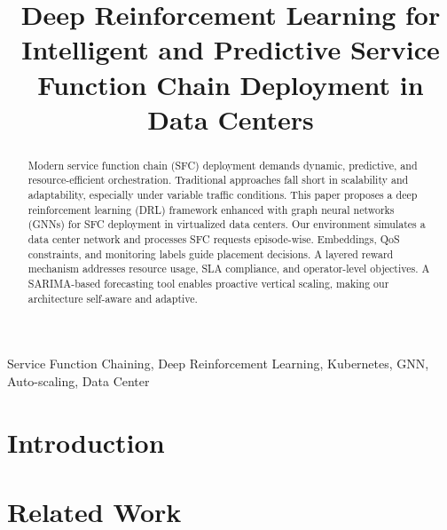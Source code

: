\documentclass[conference]{IEEEtran}
\begin{document}
	
	\title{Deep Reinforcement Learning for Intelligent and Predictive Service Function Chain Deployment in Data Centers}
	
	\author{
	}
	
	\maketitle
	
	\begin{abstract}
		Modern service function chain (SFC) deployment demands dynamic, predictive, and resource-efficient orchestration. Traditional approaches fall short in scalability and adaptability, especially under variable traffic conditions. This paper proposes a deep reinforcement learning (DRL) framework enhanced with graph neural networks (GNNs) for SFC deployment in virtualized data centers. Our environment simulates a data center network and processes SFC requests episode-wise. Embeddings, QoS constraints, and monitoring labels guide placement decisions. A layered reward mechanism addresses resource usage, SLA compliance, and operator-level objectives. A SARIMA-based forecasting tool enables proactive vertical scaling, making our architecture self-aware and adaptive.
	\end{abstract}
	
	\begin{IEEEkeywords}
		Service Function Chaining, Deep Reinforcement Learning, Kubernetes, GNN, Auto-scaling, Data Center
	\end{IEEEkeywords}
	
	\section{Introduction}
	
	\section{Related Work}
	
\end{document}
